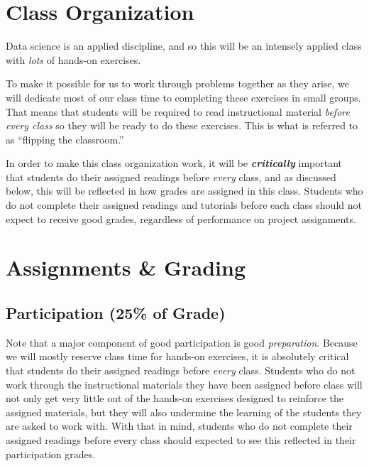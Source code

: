 \documentclass[12pt]{article}
\begin{document}
\section{Class Organization}

Data science is an applied discipline, and so this will be an intensely applied class with \emph{lots} of hands-on exercises.

To make it possible for us to work through problems together as they arise, we will dedicate most of our class time to completing these exercises in small groups. That means that students will be required to read instructional material \emph{before every class} so they will be ready to do these exercises. This is what is referred to as ``flipping the classroom.''

In order to make this class organization work, it will be \textbf{\emph{critically}} important that students do their assigned readings before \emph{every} class, and as discussed below, this will be reflected in how grades are assigned in this class. Students who do not complete their assigned readings and tutorials before each class should not expect to receive good grades, regardless of performance on project assignments.






\section{Assignments \& Grading}

\subsection{Participation (25\% of Grade)}

Note that a major component of good participation is good \emph{preparation}. Because we will mostly reserve class time for hands-on exercises, it is absolutely critical that students do their assigned readings before \emph{every} class. Students who do not work through the instructional materials they have been assigned before class will not only get very little out of the hands-on exercises designed to reinforce the assigned materials, but they will also undermine the learning of the students they are asked to work with. With that in mind, students who do not complete their assigned readings before every class should expected to see this reflected in their participation grades.
\end{document}
